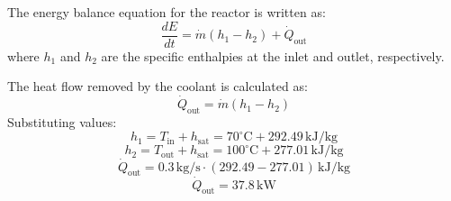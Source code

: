 The energy balance equation for the reactor is written as:  
\[
\frac{dE}{dt} = \dot{m}(h_1 - h_2) + \dot{Q}_{\text{out}}
\]  
where \( h_1 \) and \( h_2 \) are the specific enthalpies at the inlet and outlet, respectively.  

The heat flow removed by the coolant is calculated as:  
\[
\dot{Q}_{\text{out}} = \dot{m}(h_1 - h_2)
\]  
Substituting values:  
\[
h_1 = T_{\text{in}} + h_{\text{sat}} = 70^\circ\text{C} + 292.49 \, \text{kJ/kg}
\]  
\[
h_2 = T_{\text{out}} + h_{\text{sat}} = 100^\circ\text{C} + 277.01 \, \text{kJ/kg}
\]  
\[
\dot{Q}_{\text{out}} = 0.3 \, \text{kg/s} \cdot (292.49 - 277.01) \, \text{kJ/kg}
\]  
\[
\dot{Q}_{\text{out}} = 37.8 \, \text{kW}
\]